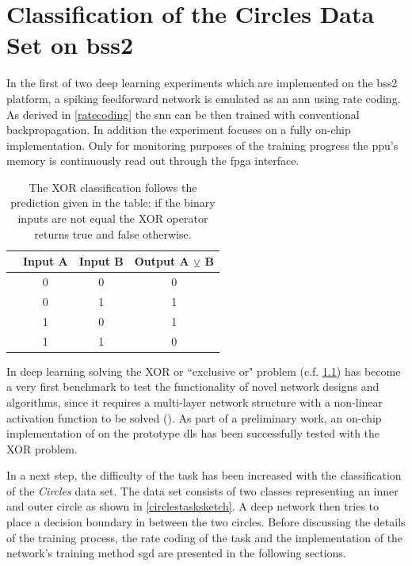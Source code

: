 \chapter{Classification of the Circles Data Set on \acrshort{bss2}}
\label{circles}
In the first of two deep learning experiments which are implemented on the \gls{bss2} platform, a spiking feedforward network is emulated as an \gls{ann} using rate coding. As derived in \cref{ratecoding} the \gls{snn} can be then trained with conventional backpropagation. In addition the experiment focuses on a fully on-chip implementation. %
Only for monitoring purposes of the training progress the \gls{ppu}'s memory is continuously read out through the \gls{fpga} interface.

\begin{table}[htb!]\centering{}
	\begin{tabular}{@{}rccc@{}}\toprule
		& Input A								& Input B 			& Output A $\veebar$ B	\\ \midrule
		& 0	& 	0	&	0	\\
		& 0	& 	1 	&	1	\\
		& 1 &	0	& 	1\\
		& 1&	1	& 	0\\
		\bottomrule
	\end{tabular}
	\caption[XOR classification.]{The XOR classification follows the prediction given in the table: if the binary inputs are not equal the XOR operator returns true and false otherwise.} 
	\label{xortruthtable}
\end{table}

In deep learning solving the XOR or ``exclusive or" problem (c.f. \cref{xortruthtable}) has become a very first benchmark to test the functionality of novel network designs and algorithms, since it requires a multi-layer network structure with a non-linear activation function to be solved (\citealp{Goodfellow-et-al-2016}). As part of a preliminary work, an on-chip implementation of  on the prototype \gls{dls} has been successfully tested with the XOR problem.

In a next step, the difficulty of the task has been increased with the classification of the \emph{Circles} data set. The data set consists of two classes representing an inner and outer circle as shown in \cref{circlestasksketch}. A deep network then tries to place a decision boundary in between the two circles. Before discussing the details of the training process, the rate coding of the task and the implementation of the network's training method \gls{sgd} are presented in the following sections. 

